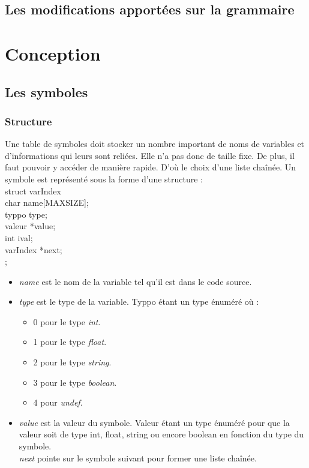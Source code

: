 \documentclass{article}
\begin{document}
\subsection{Les modifications apportées sur la grammaire}


\section{Conception}

\subsection{Les symboles} 


\subsubsection*{Structure}
Une table de symboles doit stocker un nombre important de noms de variables et d'informations qui leurs sont reliées. Elle n'a pas donc de taille fixe. De plus, il faut pouvoir y accéder de manière rapide. D'où le choix d'une liste chaînée. 
Un symbole est représenté sous la forme d'une structure :  \\

struct varIndex { \\
char name[MAXSIZE]; \\
typpo type; \\
valeur *value; \\
int ival; \\
varIndex *next; \\
}; \\

\begin{itemize}
\item \emph{name} est le nom de la variable tel qu'il est dans le code source. \\
\item \emph{type} est le type de la variable. Typpo étant un type énuméré où : \\
\begin{itemize}
\item 0 pour le type \emph{int}. \\
\item 1 pour le type \emph{float}.\\
\item 2 pour le type \emph{string}. \\
\item 3 pour le type \emph{boolean}. \\
\item 4 pour \emph{undef}. \\
\end{itemize}

\item \emph{value} est la valeur du symbole. Valeur étant un type énuméré pour que la valeur soit de type int, float, string ou encore boolean en fonction du type du symbole.\\
\emph{next} pointe sur le symbole suivant pour former une liste chaînée. \\
\end{itemize}
\end{document}
